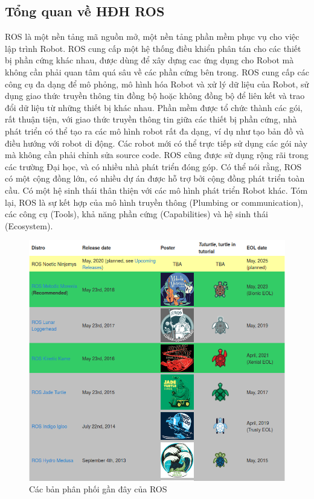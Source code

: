 {\subsection{Tổng quan về HĐH ROS}
ROS là một nền tảng mã nguồn mở, một nền tảng phần mềm phục vụ cho việc
lập trình Robot. ROS cung cấp một hệ thống điều khiển phân tán cho các thiết bị
phần cứng khác nhau, được dùng để xây dựng cac ứng dụng cho Robot mà không
cần phải quan tâm quá sâu về các phần cứng bên trong. ROS cung cấp các công cụ
đa dạng để mô phỏng, mô hình hóa Robot và xử lý dữ liệu của Robot, sử dụng giao
thức truyền thông tin đồng bộ hoặc không đồng bộ để liên kết và trao đổi dữ liệu
từ những thiết bị khác nhau.
Phần mềm được tổ chức thành các gói, rất thuận tiện, với giao thức truyền thông tin giữa các thiết bị phần cứng, nhà phát triển có thể tạo ra các mô hình robot
rất đa dạng, ví dụ như tạo bản đồ và điều hướng với robot di động. Các robot mới
có thể trực tiếp sử dụng các gói này mà không cần phải chỉnh sửa source code.
ROS cũng được sử dụng rộng rãi trong các trường Đại học, và có nhiều nhà phát
triển đóng góp. Có thể nói rằng, ROS có một cộng đồng lớn, có nhiều dự án được
hỗ trợ bởi cộng đồng phát triển toàn cầu. Có một hệ sinh thái thân thiện với các
mô hình phát triển Robot khác.
Tóm lại, ROS là sự kết hợp của mô hình truyền thông (Plumbing or
communication), các công cụ (Tools), khả năng phần cứng (Capabilities) và hệ
sinh thái (Ecosystem).

\begin{figure}[htbp]
  \centering
  \includegraphics[width=0.9\linewidth]{figures/ROS-ditributions.png}
  \caption{Các bản phân phối gần đây của ROS \cite{wikiros}}
  \label{fig:ROS-distributions}
\end{figure}

}

